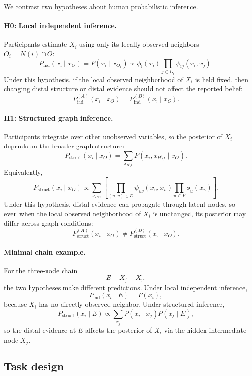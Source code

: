 We contrast two hypotheses about human probabilistic inference.

\paragraph{H0: Local independent inference.}
Participants estimate \(X_i\) using only its locally observed neighbors \(O_i=N(i)\cap O\):
\[
P_{\mathrm{ind}}(x_i\mid x_O)
=
P(x_i\mid x_{O_i})
\propto
\phi_i(x_i)\prod_{j\in O_i}\psi_{ij}(x_i,x_j).
\]
Under this hypothesis, if the local observed neighborhood of \(X_i\) is held fixed, then changing distal structure or distal evidence should not affect the reported belief:
\[
P_{\mathrm{ind}}^{(A)}(x_i\mid x_O)=P_{\mathrm{ind}}^{(B)}(x_i\mid x_O).
\]

\paragraph{H1: Structured graph inference.}
Participants integrate over other unobserved variables, so the posterior of \(X_i\) depends on the broader graph structure:
\[
P_{\mathrm{struct}}(x_i\mid x_O)
=
\sum_{x_{H\setminus i}} P(x_i,x_{H\setminus i}\mid x_O).
\]
Equivalently,
\[
P_{\mathrm{struct}}(x_i\mid x_O)
\propto
\sum_{x_{H\setminus i}}
\left[
\prod_{(u,v)\in E}\psi_{uv}(x_u,x_v)\prod_{u\in V}\phi_u(x_u)
\right].
\]
Under this hypothesis, distal evidence can propagate through latent nodes, so even when the local observed neighborhood of \(X_i\) is unchanged, its posterior may differ across graph conditions:
\[
P_{\mathrm{struct}}^{(A)}(x_i\mid x_O)\neq P_{\mathrm{struct}}^{(B)}(x_i\mid x_O).
\]

\paragraph{Minimal chain example.}
For the three-node chain
\[
E - X_j - X_i,
\]
the two hypotheses make different predictions. Under local independent inference,
\[
P_{\mathrm{ind}}(x_i\mid E)=P(x_i),
\]
because \(X_i\) has no directly observed neighbor. Under structured inference,
\[
P_{\mathrm{struct}}(x_i\mid E)
\propto
\sum_{x_j} P(x_i\mid x_j)P(x_j\mid E),
\]
so the distal evidence at \(E\) affects the posterior of \(X_i\) via the hidden intermediate node \(X_j\).

        
        
     \subsection{Task design}


